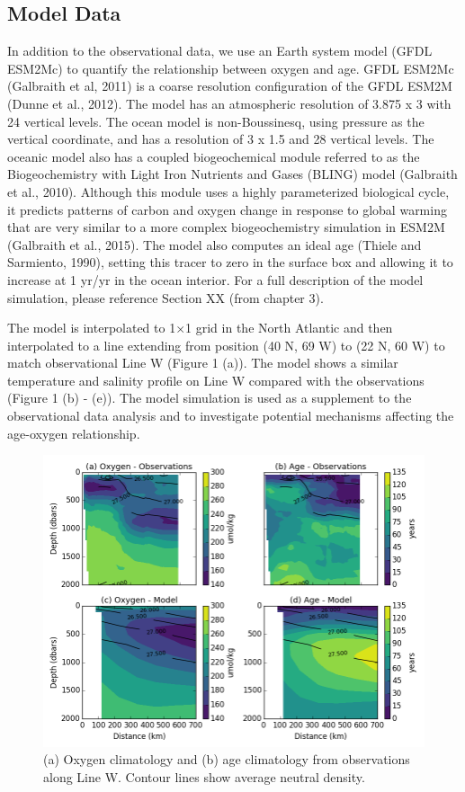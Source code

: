 \subsection{Model Data}
In addition to the observational data, we use an Earth system model (GFDL ESM2Mc) to quantify the relationship between oxygen and age. GFDL ESM2Mc (Galbraith et al, 2011) is a coarse resolution configuration of the GFDL ESM2M (Dunne et al., 2012). The model has an atmospheric resolution of 3.875  x 3  with 24 vertical levels. The ocean model is non-Boussinesq, using pressure as the vertical coordinate, and has a resolution of 3  x 1.5  and 28 vertical levels. The oceanic model also has a coupled biogeochemical module referred to as the Biogeochemistry with Light Iron Nutrients and Gases (BLING) model (Galbraith et al., 2010). Although this module uses a highly parameterized biological cycle, it predicts patterns of carbon and oxygen change in response to global warming that are very similar to a more complex biogeochemistry simulation in ESM2M (Galbraith et al., 2015). The model also computes an ideal age (Thiele and Sarmiento, 1990), setting this tracer to zero in the surface box and allowing it to increase at 1 yr/yr in the ocean interior. For a full description of the model simulation, please reference Section XX (from chapter 3).

The model is interpolated to 1$\times$1  grid in the North Atlantic and then interpolated to a line extending from position (40 N, 69 W) to (22 N, 60 W) to match observational Line W (Figure 1 (a)). The model shows a similar temperature and salinity profile on Line W compared with the observations (Figure 1 (b) - (e)). The model simulation is used as a supplement to the observational data analysis and to investigate potential mechanisms affecting the age-oxygen relationship.

\begin{figure}
\centering
\includegraphics[width=\linewidth]{age_oxygen_climatology.png}
\caption{(a) Oxygen climatology and (b) age climatology from observations along Line W. Contour lines show average neutral density. }
\label{fig:fig3}
\end{figure}

